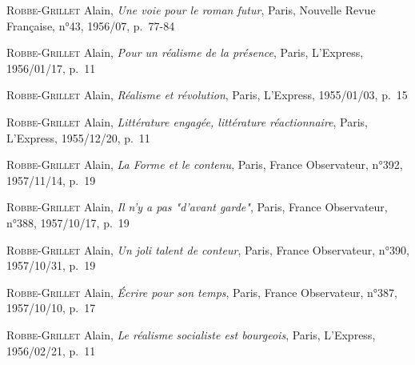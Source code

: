 \documentclass[12pt, a4paper]{article}
\begin{document}
		
		
		
	
		\textsc{Robbe-Grillet} Alain, \textit{Une voie pour le roman futur}, Paris, Nouvelle Revue Française, n°43, 1956/07, p.~77-84\par
		
		
		
		
	
		\textsc{Robbe-Grillet} Alain, \textit{Pour un réalisme de la présence}, Paris, L'Express, 1956/01/17, p.~11\par
		
		
		
		
	
		\textsc{Robbe-Grillet} Alain, \textit{Réalisme et révolution}, Paris, L'Express, 1955/01/03, p.~15\par
		
		
		
		
	
		\textsc{Robbe-Grillet} Alain, \textit{Littérature engagée, littérature réactionnaire}, Paris, L'Express, 1955/12/20, p.~11\par
		
		
		
		
	
		\textsc{Robbe-Grillet} Alain, \textit{La Forme et le contenu}, Paris, France Observateur, n°392, 1957/11/14, p.~19\par
		
		
		
		
	
		\textsc{Robbe-Grillet} Alain, \textit{Il n'y a pas "d'avant garde"}, Paris, France Observateur, n°388, 1957/10/17, p.~19\par
		
		
		
		
	
		\textsc{Robbe-Grillet} Alain, \textit{Un joli talent de conteur}, Paris, France Observateur, n°390, 1957/10/31, p.~19\par
		
		
		
		
	
		\textsc{Robbe-Grillet} Alain, \textit{Écrire pour son temps}, Paris, France Observateur, n°387, 1957/10/10, p.~17\par
		
		
		
		
	
		\textsc{Robbe-Grillet} Alain, \textit{Le réalisme socialiste est bourgeois}, Paris, L'Express, 1956/02/21, p.~11\par
		
\end{document}

